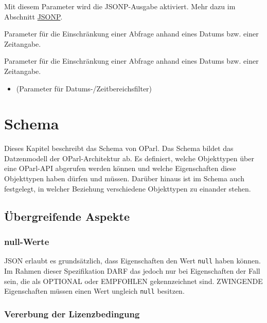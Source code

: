 \documentclass[,a4paper]{article}
\begin{document}
\begin{description}
\itemsep1pt\parskip0pt
\item[callback:]
Mit diesem Parameter wird die JSONP-Ausgabe aktiviert. Mehr dazu im
Abschnitt \hyperref[jsonp]{JSONP}.
\item[startdate:]
Parameter für die Einschränkung einer Abfrage anhand eines Datums bzw.
einer Zeitangabe.
\item[enddate:]
Parameter für die Einschränkung einer Abfrage anhand eines Datums bzw.
einer Zeitangabe.
\end{description}

\begin{itemize}
\itemsep1pt\parskip0pt
\item
  (Parameter für Datums-/Zeitbereichsfilter)
\end{itemize}

\section{Schema}\label{schema}

Dieses Kapitel beschreibt das Schema von OParl. Das Schema bildet das
Datzenmodell der OParl-Architektur ab. Es definiert, welche Objekttypen
über eine OParl-API abgerufen werden können und welche Eigenschaften
diese Objekttypen haben dürfen und müssen. Darüber hinaus ist im Schema
auch festgelegt, in welcher Beziehung verschiedene Objekttypen zu
einander stehen.

\subsection{Übergreifende Aspekte}\label{uxfcbergreifende-aspekte}

\subsubsection{null-Werte}\label{null-werte}

JSON erlaubt es grundsätzlich, dass Eigenschaften den Wert \texttt{null}
haben können. Im Rahmen dieser Spezifikation DARF das jedoch nur bei
Eigenschaften der Fall sein, die als OPTIONAL oder EMPFOHLEN
gekennzeichnet sind. ZWINGENDE Eigenschaften müssen einen Wert ungleich
\texttt{null} besitzen.

\subsubsection{Vererbung der
Lizenzbedingung}\label{vererbung-der-lizenzbedingung}
\end{document}

